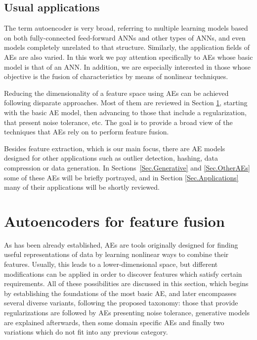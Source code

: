 \documentclass[preprint,5p,compress]{elsarticle}
\begin{document}
\subsection{Usual applications}
The term autoencoder is very broad, referring to multiple learning models based on both fully-connected feed-forward ANNs and other types of ANNs, and even models completely unrelated to that structure. Similarly, the application fields of AEs are also varied.  In this work we pay attention specifically to AEs whose basic model is that of an ANN. In addition, we are especially interested in those whose objective is the fusion of characteristics by means of nonlinear techniques.

Reducing the dimensionality of a feature space using AEs can be achieved following disparate approaches. Most of them are reviewed in Section \ref{Sect.AEforFF}, starting with the basic AE model, then advancing to those that include a regularization, that present noise tolerance, etc. The goal is to provide a broad view of the techniques that AEs rely on to perform feature fusion.

Besides feature extraction, which is our main focus, there are AE models designed for other applications such as outlier detection, hashing, data compression or data generation. In Sections~\ref{Sec.Generative} and \ref{Sec.OtherAEs} some of these AEs will be briefly portrayed, and in Section \ref{Sec.Applications} many of their applications will be shortly reviewed. 


\section{Autoencoders for feature fusion}\label{Sect.AEforFF}

As has been already established, AEs are tools originally designed for finding useful representations of data by learning nonlinear ways to combine their features. Usually, this leads to a lower-dimensional space, but different modifications can be applied in order to discover features which satisfy certain requirements. All of these possibilities are discussed in this section, which begins by establishing the foundations of the most basic AE, and later encompasses several diverse variants, following the proposed taxonomy: those that provide regularizations are followed by AEs presenting noise tolerance, generative models are explained afterwards, then some domain specific AEs and finally two variations which do not fit into any previous category.
\end{document}
